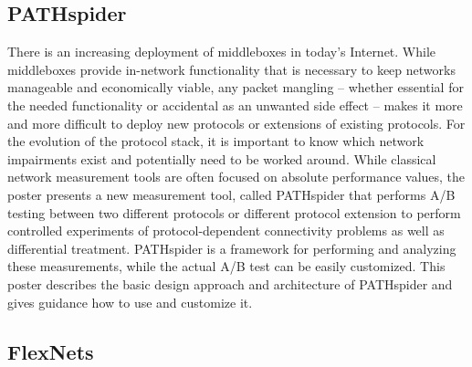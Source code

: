 \subsection{PATHspider}

There is an increasing deployment of middleboxes in today’s Internet.  While
middleboxes provide in-network functionality that is necessary to keep
networks manageable and economically viable, any packet mangling – whether
essential for the needed functionality or accidental as an unwanted side
effect – makes it more and more difficult to deploy new protocols or
extensions of existing protocols. For the evolution of the protocol stack, it
is important to know which network impairments exist and potentially need to
be worked around. While classical network measurement tools are often focused
on absolute performance values, the poster presents a new measurement tool,
called PATHspider \cite{ilearmonth:anrw:2016} that performs A/B testing
between two different protocols or different protocol extension to perform
controlled experiments of protocol-dependent connectivity problems as well as
differential treatment.  PATHspider is a framework for performing and
analyzing these measurements, while the actual A/B test can be easily
customized. This poster describes the basic design approach and architecture
of PATHspider and gives guidance how to use and customize it.

\subsection{FlexNets}

